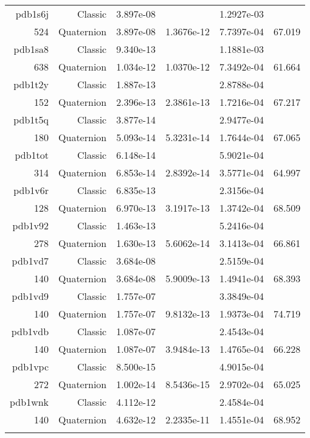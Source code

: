 \begin{xltabular}{\textwidth}{r|rS[table-format=1.3e+2]S[table-format=1.4e+2]S[table-format=1.4e+2]S[table-format=-1.3]}
pdb1s6j & Classic & 3.897e-08 &  & 1.2927e-03 & \\
524 & Quaternion & 3.897e-08 & 1.3676e-12 & 7.7397e-04 & 67.019\\  \addlinespace
pdb1sa8 & Classic & 9.340e-13 &  & 1.1881e-03 & \\
638 & Quaternion & 1.034e-12 & 1.0370e-12 & 7.3492e-04 & 61.664\\  \addlinespace
pdb1t2y & Classic & 1.887e-13 &  & 2.8788e-04 & \\
152 & Quaternion & 2.396e-13 & 2.3861e-13 & 1.7216e-04 & 67.217\\  \addlinespace
pdb1t5q & Classic & 3.877e-14 &  & 2.9477e-04 & \\
180 & Quaternion & 5.093e-14 & 5.3231e-14 & 1.7644e-04 & 67.065\\  \addlinespace
pdb1tot & Classic & 6.148e-14 &  & 5.9021e-04 & \\
314 & Quaternion & 6.853e-14 & 2.8392e-14 & 3.5771e-04 & 64.997\\  \addlinespace
pdb1v6r & Classic & 6.835e-13 &  & 2.3156e-04 & \\
128 & Quaternion & 6.970e-13 & 3.1917e-13 & 1.3742e-04 & 68.509\\  \addlinespace
pdb1v92 & Classic & 1.463e-13 &  & 5.2416e-04 & \\
278 & Quaternion & 1.630e-13 & 5.6062e-14 & 3.1413e-04 & 66.861\\  \addlinespace
pdb1vd7 & Classic & 3.684e-08 &  & 2.5159e-04 & \\
140 & Quaternion & 3.684e-08 & 5.9009e-13 & 1.4941e-04 & 68.393\\  \addlinespace
pdb1vd9 & Classic & 1.757e-07 &  & 3.3849e-04 & \\
140 & Quaternion & 1.757e-07 & 9.8132e-13 & 1.9373e-04 & 74.719\\  \addlinespace
pdb1vdb & Classic & 1.087e-07 &  & 2.4543e-04 & \\
140 & Quaternion & 1.087e-07 & 3.9484e-13 & 1.4765e-04 & 66.228\\  \addlinespace
pdb1vpc & Classic & 8.500e-15 &  & 4.9015e-04 & \\
272 & Quaternion & 1.002e-14 & 8.5436e-15 & 2.9702e-04 & 65.025\\  \addlinespace
pdb1wnk & Classic & 4.112e-12 &  & 2.4584e-04 & \\
140 & Quaternion & 4.632e-12 & 2.2335e-11 & 1.4551e-04 & 68.952\\  \addlinespace

\end{xltabular}
